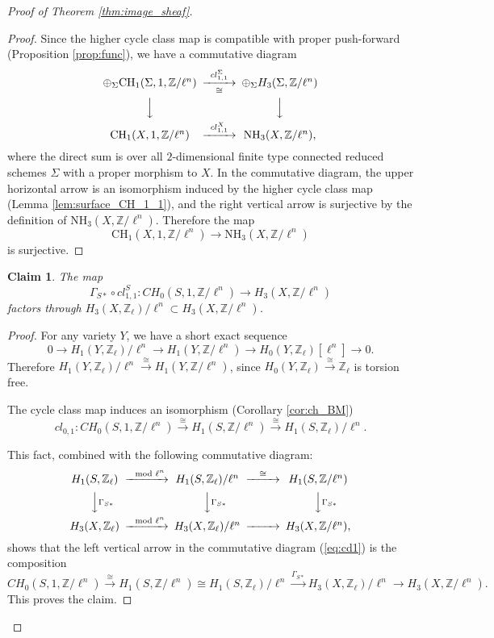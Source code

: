 \documentclass{amsart}
\newtheorem{claim}[theorem]{Claim}
\theoremstyle{definition}
\theoremstyle{remark}
\newcommand{\mbb}{\mathbb}
\newcommand{\ZZ}{\mbb{Z}}
\begin{document}
\begin{proof}[Proof of Theorem {\ref{thm:image_sheaf}}]
\begin{proof}
Since the higher cycle class map is compatible with proper push-forward (Proposition \ref{prop:func}), we have a commutative diagram 
\[
\begin{CD}
    \oplus_\Sigma \text{CH}_1(\Sigma, 1, \ZZ/\ell^n) @>cl_{1,1}^\Sigma>\cong> \oplus_\Sigma H_3(\Sigma, \ZZ/\ell^n)\\
    @VVV @VVV\\
    \text{CH}_1(X, 1, \ZZ/\ell^n) @>cl_{1, 1}^X>> \text{NH}_3(X, \ZZ/\ell^n),
\end{CD}
\]
where the direct sum is over all $2$-dimensional finite type connected reduced schemes $\Sigma$ with a proper morphism to $X$.
In the commutative diagram,
the upper horizontal arrow is an isomorphism induced by the higher cycle class map (Lemma \ref{lem:surface_CH_1_1}),
and the right vertical arrow is surjective by the definition of $\text{NH}_3(X, \ZZ/\ell^n)$. Therefore the map
\[
\text{CH}_1(X, 1, \ZZ/\ell^n) \to \text{NH}_3(X,\ZZ/\ell^n)
\]
is surjective.
\end{proof}
\begin{claim}\label{claim:left1}
The map 
\[
\Gamma_{S*}\circ cl^S_{1, 1}: CH_0(S, 1, \ZZ/\ell^n) \to H_3(X, \ZZ/\ell^n)
\]
factors through $H_3(X, \ZZ_\ell)/\ell^n \subset H_3(X, \ZZ/\ell^n)$.
\end{claim}
\begin{proof}
 For any variety $Y$,
we have a short exact sequence
\[
0 \to H_1(Y, \ZZ_\ell)/\ell^n \to H_1(Y, \ZZ/\ell^n) \to H_0(Y, \ZZ_\ell)[\ell^n] \to 0.
\]
Therefore $H_1(Y, \ZZ_\ell)/\ell^n \xrightarrow{\cong} H_1(Y, \ZZ/\ell^n)$,
since $H_0(Y, \ZZ_\ell)\xrightarrow{\cong} \ZZ_\ell$ is torsion free.

The cycle class map induces an isomorphism (Corollary \ref{cor:ch_BM})$$cl_{0, 1}:CH_0(S,1, \ZZ/\ell^n) \xrightarrow{\cong} H_1(S, \ZZ/\ell^n)\xrightarrow{\cong} H_1(S, \ZZ_\ell)/\ell^n.$$

This fact, combined with the following commutative diagram:
\[
\begin{CD}
    H_1(S, \ZZ_\ell)@>\mod \ell^n >> H_1(S, \ZZ_\ell)/\ell^n @>\cong >> H_1(S, \ZZ/\ell^n)\\
    @VV\Gamma_{S*}V @VV\Gamma_{S*}V @VV\Gamma_{S*} V\\
    H_3(X, \ZZ_\ell)@>\mod \ell^n>> H_3(X, \ZZ_\ell)/\ell^n @>>> H_3(X, \ZZ/\ell^n),
\end{CD}
\]
shows that the left vertical arrow in the commutative diagram (\ref{eq:cd1}) is the composition
\[
    CH_0(S, 1, \ZZ/\ell^n) \xrightarrow{\cong} H_1(S, \ZZ/\ell^n)\cong H_1(S, \ZZ_\ell)/\ell^n \xrightarrow{\Gamma_{S*}} H_3(X, \ZZ_\ell)/\ell^n\to H_3(X, \ZZ/\ell^n).
\]
This proves the claim.
\end{proof}


\end{proof}
\end{document}
